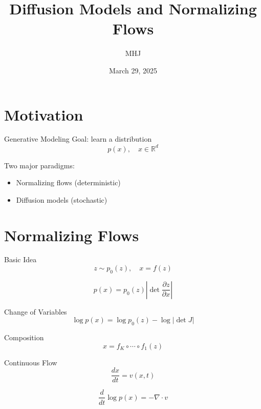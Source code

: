 \documentclass{beamer}
\title{Diffusion Models and Normalizing Flows}
\author{MHJ}
\date{March 29, 2025}
\begin{document}
\frame{\titlepage}

\section{Motivation}

\begin{frame}{Generative Modeling}
Goal: learn a distribution
\[
p(x), \quad x \in \mathbb{R}^d
\]

Two major paradigms:
\begin{itemize}
\item Normalizing flows (deterministic)
\item Diffusion models (stochastic)
\end{itemize}
\end{frame}

\section{Normalizing Flows}

\begin{frame}{Basic Idea}
\[
z \sim p_0(z), \quad x = f(z)
\]

\[
p(x) = p_0(z)\left|\det \frac{\partial z}{\partial x}\right|
\]
\end{frame}


\begin{frame}{Change of Variables}
\[
\log p(x) = \log p_0(z) - \log |\det J|
\]
\end{frame}


\begin{frame}{Composition}
\[
x = f_K \circ \cdots \circ f_1(z)
\]
\end{frame}


\begin{frame}{Continuous Flow}
\[
\frac{dx}{dt} = v(x,t)
\]

\[
\frac{d}{dt}\log p(x) = -\nabla \cdot v
\]
\end{frame}

\end{document}
